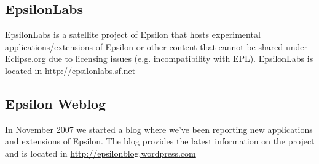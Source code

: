 \subsection{EpsilonLabs}

EpsilonLabs is a satellite project of Epsilon that hosts experimental applications/extensions of Epsilon or other content that cannot be shared under Eclipse.org due to licensing issues (e.g. incompatibility with EPL). EpsilonLabs is located in \url{http://epsilonlabs.sf.net}

\subsection{Epsilon Weblog}
In November 2007 we started a blog where we've been reporting new applications and extensions of Epsilon. The blog provides the latest information on the project and is located in \url{http://epsilonblog.wordpress.com}